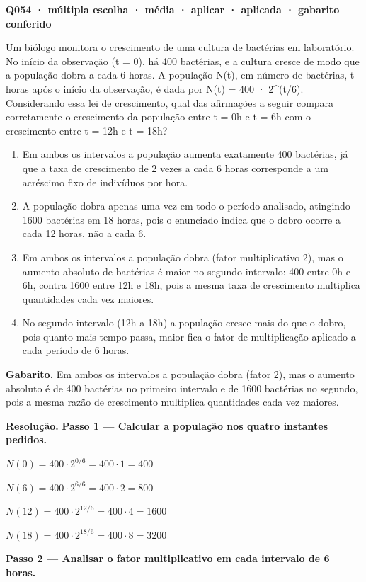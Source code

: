 \documentclass[11pt,a4paper]{article}
\begin{document}
\bigskip\noindent\textbf{Q054 · múltipla escolha · média · aplicar · aplicada · gabarito conferido}\par\nopagebreak
Um biólogo monitora o crescimento de uma cultura de bactérias em laboratório. No início da observação (t = 0), há 400 bactérias, e a cultura cresce de modo que a população dobra a cada 6 horas. A população N(t), em número de bactérias, t horas após o início da observação, é dada por N(t) = 400 · 2\textasciicircum{}(t/6). Considerando essa lei de crescimento, qual das afirmações a seguir compara corretamente o crescimento da população entre t = 0h e t = 6h com o crescimento entre t = 12h e t = 18h?
\begin{enumerate}[label=(\alph*)]
\item Em ambos os intervalos a população aumenta exatamente 400 bactérias, já que a taxa de crescimento de 2 vezes a cada 6 horas corresponde a um acréscimo fixo de indivíduos por hora.
\item A população dobra apenas uma vez em todo o período analisado, atingindo 1600 bactérias em 18 horas, pois o enunciado indica que o dobro ocorre a cada 12 horas, não a cada 6.
\item Em ambos os intervalos a população dobra (fator multiplicativo 2), mas o aumento absoluto de bactérias é maior no segundo intervalo: 400 entre 0h e 6h, contra 1600 entre 12h e 18h, pois a mesma taxa de crescimento multiplica quantidades cada vez maiores.
\item No segundo intervalo (12h a 18h) a população cresce mais do que o dobro, pois quanto mais tempo passa, maior fica o fator de multiplicação aplicado a cada período de 6 horas.
\end{enumerate}

\textbf{Gabarito.} Em ambos os intervalos a população dobra (fator 2), mas o aumento absoluto é de 400 bactérias no primeiro intervalo e de 1600 bactérias no segundo, pois a mesma razão de crescimento multiplica quantidades cada vez maiores.

\textbf{Resolução.} \textbf{Passo 1 — Calcular a população nos quatro instantes pedidos.}

$N(0) = 400 \cdot 2^{0/6} = 400 \cdot 1 = 400$

$N(6) = 400 \cdot 2^{6/6} = 400 \cdot 2 = 800$

$N(12) = 400 \cdot 2^{12/6} = 400 \cdot 4 = 1600$

$N(18) = 400 \cdot 2^{18/6} = 400 \cdot 8 = 3200$

\textbf{Passo 2 — Analisar o fator multiplicativo em cada intervalo de 6 horas.}
\end{document}
